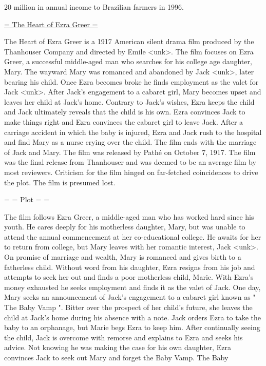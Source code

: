 20 million in annual income to Brazilian farmers in 1996. 


\underline{= The Heart of Ezra Greer =}

The Heart of Ezra Greer is a 1917 American silent drama film produced by the Thanhouser Company and directed by Emile <unk>. The film focuses on Ezra Greer, a successful middle-aged man who searches for his college age daughter, Mary. The wayward Mary was romanced and abandoned by Jack <unk>, later bearing his child. Once Ezra becomes broke he finds employment as the valet for Jack <unk>. After Jack's engagement to a cabaret girl, Mary becomes upset and leaves her child at Jack's home. Contrary to Jack's wishes, Ezra keeps the child and Jack ultimately reveals that the child is his own. Ezra convinces Jack to make things right and Ezra convinces the cabaret girl to leave Jack. After a carriage accident in which the baby is injured, Ezra and Jack rush to the hospital and find Mary as a nurse crying over the child. The film ends with the marriage of Jack and Mary. The film was released by Pathé on October 7, 1917. The film was the final release from Thanhouser and was deemed to be an average film by most reviewers. Criticism for the film hinged on far-fetched coincidences to drive the plot. The film is presumed lost. 

= = Plot = = 

The film follows Ezra Greer, a middle-aged man who has worked hard since his youth. He cares deeply for his motherless daughter, Mary, but was unable to attend the annual commencement at her co-educational college. He awaits for her to return from college, but Mary leaves with her romantic interest, Jack <unk>. On promise of marriage and wealth, Mary is romanced and gives birth to a fatherless child. Without word from his daughter, Ezra resigns from his job and attempts to seek her out and finds a poor motherless child, Marie. With Ezra's money exhausted he seeks employment and finds it as the valet of Jack. 
One day, Mary seeks an announcement of Jack's engagement to a cabaret girl known as " The Baby Vamp ". Bitter over the prospect of her child's future, she leaves the child at Jack's home during his absence with a note. Jack orders Ezra to take the baby to an orphanage, but Marie begs Ezra to keep him. After continually seeing the child, Jack is overcome with remorse and explains to Ezra and seeks his advice. Not knowing he was making the case for his own daughter, Ezra convinces Jack to seek out Mary and forget the Baby Vamp. The Baby 